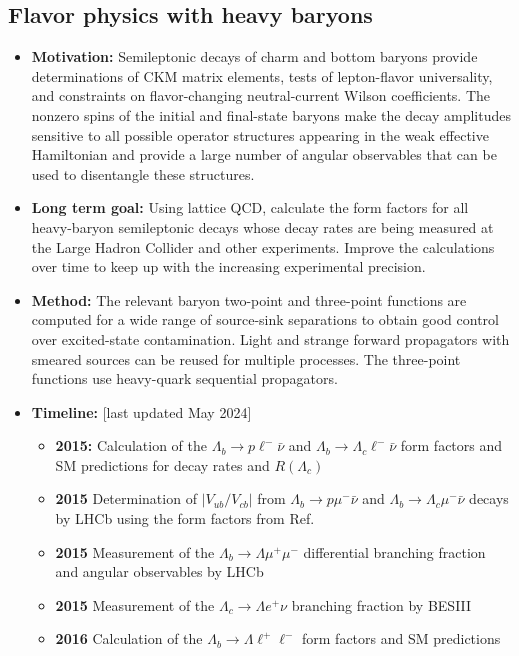 \documentclass[12pt,hyperpdf]{article}
\begin{document}
\subsection{Flavor physics with heavy baryons}
\begin{itemize}
   \item{\bf Motivation:} Semileptonic decays of charm and bottom baryons provide determinations of CKM matrix elements, tests of lepton-flavor universality, and constraints on flavor-changing neutral-current Wilson coefficients. The nonzero spins of the initial and final-state baryons make the decay amplitudes sensitive to all possible operator structures appearing in the weak effective Hamiltonian and provide a large number of angular observables that can be used to disentangle these structures.
   \item{\bf Long term goal:} Using lattice QCD, calculate the form factors for all heavy-baryon semileptonic decays whose decay rates are being measured at the Large Hadron Collider and other experiments. Improve the calculations over time to keep up with the increasing experimental precision.
   \item{\bf Method:} The relevant baryon two-point and three-point functions are computed for a wide range of source-sink separations to obtain good control over excited-state contamination. Light and strange forward propagators with smeared sources can be reused for multiple processes. The three-point functions use heavy-quark sequential propagators.
\item{\bf Timeline:} \hfill [last updated May 2024]
\begin{itemize}
   \item{\bf 2015:} Calculation of the $\Lambda_b\to p\ell^-\bar{\nu}$ and $\Lambda_b\to \Lambda_c\ell^-\bar{\nu}$ form factors and SM predictions for decay rates and $R(\Lambda_c)$ \cite{Detmold:2015aaa}
   \item{\bf 2015} Determination of $|V_{ub}/V_{cb}|$ from $\Lambda_b\to p\mu^-\bar{\nu}$ and $\Lambda_b\to \Lambda_c\mu^-\bar{\nu}$ decays by LHCb \cite{Aaij:2015bfa} using the form factors from Ref.~\cite{Detmold:2015aaa}
   \item{\bf 2015} Measurement of the $\Lambda_b \to \Lambda \mu^+\mu^-$ differential branching fraction and angular observables by LHCb \cite{Aaij:2015xza}
   \item{\bf 2015} Measurement of the $\Lambda_c \to \Lambda e^+\nu$ branching fraction by BESIII \cite{BESIII:2015ysy}
   \item{\bf 2016} Calculation of the $\Lambda_b \to \Lambda \ell^+\ell^-$ form factors and SM predictions \cite{Detmold:2016pkz}

\end{itemize}
\end{itemize}
\end{document}
